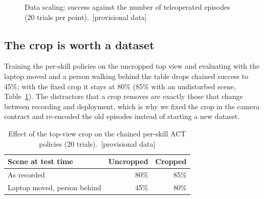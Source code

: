 \documentclass[10pt,twocolumn,letterpaper]{article}
\newif\ifprovisional \provisionaltrue
\newcommand{\prov}[1]{\ifprovisional\textcolor{prov}{#1}\else#1\fi}
\newcommand{\provtag}{\ifprovisional\ \textcolor{prov}{[provisional data]}\fi}
\begin{document}
\begin{figure}[t]
\centering
{}
\caption{Data scaling: success against the number of teleoperated episodes (20 trials per point).\provtag}
\label{fig:scaling}
\end{figure}

\subsection{The crop is worth a dataset}
Training the per-skill policies on the uncropped top view and evaluating with the laptop moved and a person walking
behind the table drops chained success to \prov{45\%}; with the fixed crop it stays at \prov{80\%} (\prov{85\%} with an
undisturbed scene,
Table~\ref{tab:crop}). The distractors that a crop removes are exactly those that change between recording and
deployment, which is why we fixed the crop in the camera contract and re-encoded the old episodes instead of starting
a new dataset.

\begin{table}[t]
\centering\small
\caption{Effect of the top-view crop on the chained per-skill ACT policies (20 trials).\provtag}
\label{tab:crop}
\begin{tabular}{@{}lrr@{}}
\toprule
Scene at test time & Uncropped & Cropped\\
\midrule
As recorded & \prov{80\%} & \prov{85\%}\\
Laptop moved, person behind & \prov{45\%} & \prov{80\%}\\
\bottomrule
\end{tabular}
\end{table}
\end{document}

